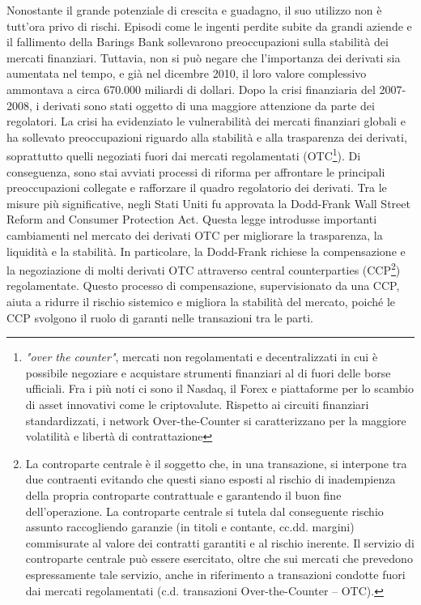 \documentclass[12pt,a4paper]{report}
\begin{document}
Nonostante il grande potenziale di crescita e guadagno, il suo utilizzo non è tutt'ora privo di rischi. Episodi come le ingenti perdite subite da grandi aziende e il fallimento della Barings Bank sollevarono preoccupazioni sulla stabilità dei mercati finanziari. Tuttavia, non si può negare che l'importanza dei derivati sia aumentata nel tempo, e già nel dicembre 2010, il loro valore complessivo ammontava a circa 670.000 miliardi di dollari.
Dopo la crisi finanziaria del 2007-2008, i derivati sono stati oggetto di una maggiore attenzione da parte dei regolatori. La crisi ha evidenziato le vulnerabilità dei mercati finanziari globali e ha sollevato preoccupazioni riguardo alla stabilità e alla trasparenza dei derivati, soprattutto quelli negoziati fuori dai mercati regolamentati (OTC\footnote{\textit{"over the counter"}, mercati non regolamentati e decentralizzati in cui è possibile negoziare e acquistare strumenti finanziari al di fuori delle borse ufficiali. Fra i più noti ci sono il Nasdaq, il Forex e piattaforme per lo scambio di asset innovativi come le criptovalute. Rispetto ai circuiti finanziari standardizzati, i network Over-the-Counter si caratterizzano per la maggiore volatilità e libertà di contrattazione}). Di conseguenza, sono stai avviati processi di riforma per affrontare le principali preoccupazioni collegate e rafforzare il quadro regolatorio dei derivati. Tra le misure più significative, negli Stati Uniti fu approvata la Dodd-Frank Wall Street Reform and Consumer Protection Act. Questa legge introdusse importanti cambiamenti nel mercato dei derivati OTC per migliorare la trasparenza, la liquidità e la stabilità. In particolare, la Dodd-Frank richiese la compensazione e la negoziazione di molti derivati OTC attraverso central counterparties (CCP\footnote{La controparte centrale è il soggetto che, in una transazione, si interpone tra due contraenti evitando che questi siano esposti al rischio di inadempienza della propria controparte contrattuale e garantendo il buon fine dell’operazione. La controparte centrale si tutela dal conseguente rischio assunto raccogliendo garanzie (in titoli e contante, cc.dd. margini) commisurate al valore dei contratti garantiti e al rischio inerente. Il servizio di controparte centrale può essere esercitato, oltre che sui mercati che prevedono espressamente tale servizio, anche in riferimento a transazioni condotte fuori dai mercati regolamentati (c.d. transazioni Over-the-Counter – OTC).}) regolamentate. Questo processo di compensazione, supervisionato da una CCP, aiuta a ridurre il rischio sistemico e migliora la stabilità del mercato, poiché le CCP svolgono il ruolo di garanti nelle transazioni tra le parti.
\end{document}
